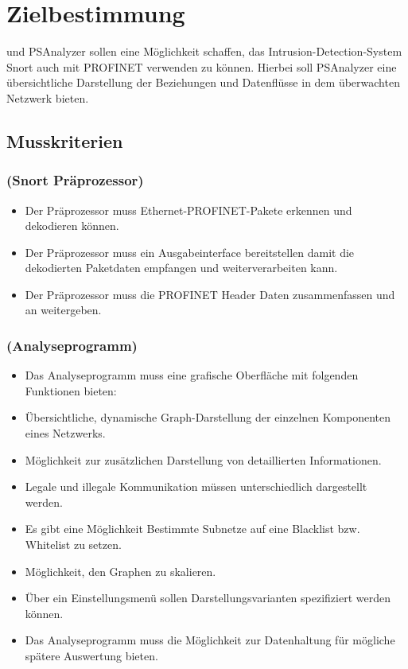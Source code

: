 \chapter{Zielbestimmung}

\programname und PSAnalyzer sollen eine Möglichkeit schaffen, das Intrusion-Detection-System Snort auch mit PROFINET verwenden zu können.
Hierbei soll PSAnalyzer eine übersichtliche Darstellung der Beziehungen und Datenflüsse in dem überwachten Netzwerk bieten.

\section{Musskriterien}

\subsection{\sppname (Snort Präprozessor)}

\begin{itemize}
\item Der Präprozessor muss Ethernet-PROFINET-Pakete erkennen und dekodieren können.

\item Der Präprozessor muss ein Ausgabeinterface bereitstellen damit \programname die dekodierten Paketdaten empfangen und weiterverarbeiten kann.

\item Der Präprozessor muss die PROFINET Header Daten zusammenfassen und an \programname weitergeben.
\end{itemize}

\subsection{\programname (Analyseprogramm)}

\begin{itemize}
\item Das Analyseprogramm muss eine grafische Oberfläche mit folgenden Funktionen bieten:

\item Übersichtliche, dynamische Graph-Darstellung der einzelnen Komponenten eines Netzwerks.

\item Möglichkeit zur zusätzlichen Darstellung von detaillierten Informationen.

\item Legale und illegale Kommunikation müssen unterschiedlich dargestellt werden.

\item Es gibt eine Möglichkeit Bestimmte Subnetze auf eine Blacklist bzw. Whitelist zu setzen.

\item Möglichkeit, den Graphen zu skalieren.

\item Über ein Einstellungsmenü sollen Darstellungsvarianten spezifiziert werden können.

\item Das Analyseprogramm muss die Möglichkeit zur Datenhaltung für mögliche spätere Auswertung bieten.
\end{itemize}

